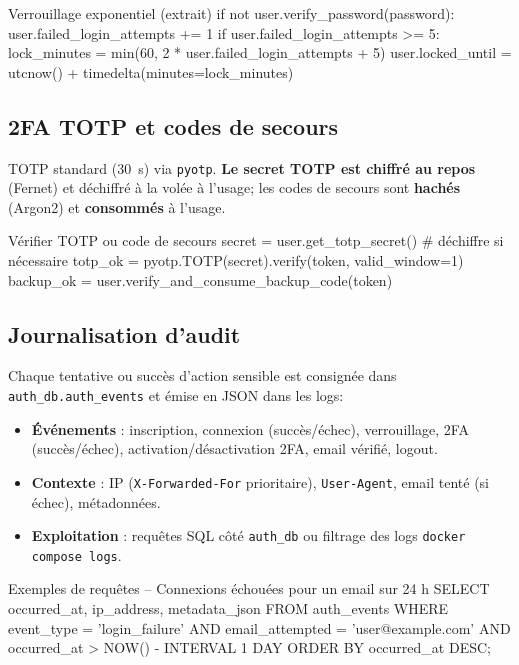 \begin{codebox}[language=Python]{Verrouillage exponentiel (extrait)}
if not user.verify_password(password):
    user.failed_login_attempts += 1
    if user.failed_login_attempts >= 5:
        lock_minutes = min(60, 2 * user.failed_login_attempts + 5)
        user.locked_until = utcnow() + timedelta(minutes=lock_minutes)
\end{codebox}

\subsection*{2FA TOTP et codes de secours}
\noindent TOTP standard (30~s) via \texttt{pyotp}. \textbf{Le secret TOTP est chiffré au repos} (Fernet) et déchiffré à la volée à l'usage; les codes de secours sont \textbf{hachés} (Argon2) et \textbf{consommés} à l'usage.
\begin{codebox}[language=Python]{Vérifier TOTP ou code de secours}
secret = user.get_totp_secret()  # déchiffre si nécessaire
totp_ok = pyotp.TOTP(secret).verify(token, valid_window=1)
backup_ok = user.verify_and_consume_backup_code(token)
\end{codebox}

\subsection*{Journalisation d'audit}
\noindent Chaque tentative ou succès d'action sensible est consignée dans \texttt{auth\_db.auth\_events} et émise en JSON dans les logs:\
\begin{itemize}
  \item \textbf{Événements} : inscription, connexion (succès/échec), verrouillage, 2FA (succès/échec), activation/désactivation 2FA, email vérifié, logout.
  \item \textbf{Contexte} : IP (\texttt{X-Forwarded-For} prioritaire), \texttt{User-Agent}, email tenté (si échec), métadonnées.
  \item \textbf{Exploitation} : requêtes SQL côté \texttt{auth\_db} ou filtrage des logs \texttt{docker compose logs}.
\end{itemize}

\begin{codebox}[language=SQL]{Exemples de requêtes}
-- Connexions échouées pour un email sur 24 h
SELECT occurred_at, ip_address, metadata_json
FROM auth_events
WHERE event_type = 'login_failure'
  AND email_attempted = 'user@example.com'
  AND occurred_at > NOW() - INTERVAL 1 DAY
ORDER BY occurred_at DESC;
\end{codebox}

